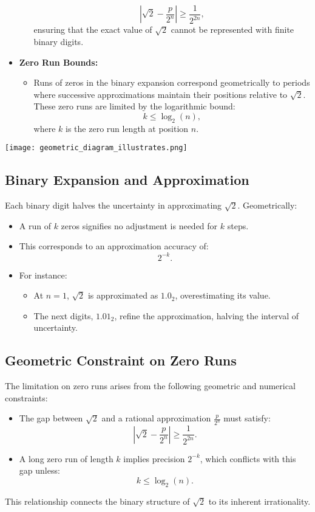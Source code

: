 \begin{itemize}
\begin{itemize}
        $$\left|\sqrt{2} - \frac{p}{2^n}\right| \geq \frac{1}{2^{2n}},$$
        ensuring that the exact value of $\sqrt{2}$ cannot be represented with finite binary digits.
    \end{itemize}
    \item \textbf{Zero Run Bounds:}
    \begin{itemize}
        \item Runs of zeros in the binary expansion correspond geometrically to periods where successive approximations maintain their positions relative to $\sqrt{2}$. These zero runs are limited by the logarithmic bound:
        $$k \leq \log_2(n),$$
        where $k$ is the zero run length at position $n$.
    \end{itemize}
\end{itemize}

\begin{center}
    \texttt{[image: geometric\_diagram\_illustrates.png]}
\end{center}

\subsection{Binary Expansion and Approximation}
Each binary digit halves the uncertainty in approximating $\sqrt{2}$. Geometrically:
\begin{itemize}
    \item A run of $k$ zeros signifies no adjustment is needed for $k$ steps.
    \item This corresponds to an approximation accuracy of:
    $$2^{-k}.$$
    \item For instance:
    \begin{itemize}
        \item At $n=1$, $\sqrt{2}$ is approximated as $1.0_2$, overestimating its value.
        \item The next digits, $1.01_2$, refine the approximation, halving the interval of uncertainty.
    \end{itemize}
\end{itemize}

\subsection{Geometric Constraint on Zero Runs}
The limitation on zero runs arises from the following geometric and numerical constraints:
\begin{itemize}
    \item The gap between $\sqrt{2}$ and a rational approximation $\frac{p}{2^n}$ must satisfy:
    $$\left|\sqrt{2} - \frac{p}{2^n}\right| \geq \frac{1}{2^{2n}}.$$
    \item A long zero run of length $k$ implies precision $2^{-k}$, which conflicts with this gap unless:
    $$k \leq \log_2(n).$$
\end{itemize}
This relationship connects the binary structure of $\sqrt{2}$ to its inherent irrationality.

